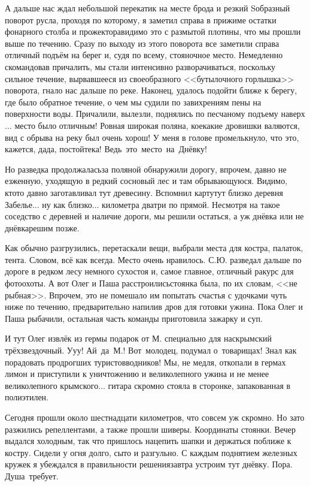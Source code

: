 А дальше нас ждал небольшой перекатик на месте брода и резкий S\sdash образный поворот русла, проходя по которому, я заметил справа в прижиме остатки фонарного столба и прожектора\mdash видимо это с размытой плотины, что мы прошли выше по течению. Сразу по выходу из этого поворота все заметили справа отличный подъём на берег и, судя по всему, стояночное место. Немедленно скомандовав причалить, мы стали интенсивно разворачиваться, поскольку сильное течение, вырвавшееся из своеобразного <<бутылочного горлышка>> поворота, гнало нас дальше по реке. Наконец, удалось подойти ближе к берегу, где было обратное течение, о чем мы судили по завихрениям пены на поверхности воды. Причалили, вылезли, поднялись по песчаному подъему наверх$\ldots$ место было отличным! Ровная широкая поляна, кое\sdash какие дровишки валяются, вид с обрыва на реку был очень хорош! У меня в голове промелькнуло, что это, кажется, да\sdash да, постойте\sdash ка! Ведь~это~место~на~Днёвку! 

Но разведка продолжалась\mdash за поляной обнаружили дорогу, впрочем, давно не езженную, уходящую в редкий сосновый лес и там обрывающуюся. Видимо, кто\sdash то давно заготавливал тут древесину. Вспомнил карту\mdash тут близко деревня Забелье$\ldots$ ну как близко$\ldots$ километра два\sdash три по прямой. Несмотря на такое соседство с деревней и наличие дороги, мы решили остаться, а уж днёвка или не днёвка\mdash решим позже.

Как обычно разгрузились, перетаскали вещи, выбрали места для костра, палаток, тента. Словом, всё как всегда. Место очень нравилось. С.Ю. разведал дальше по дороге в редком лесу немного сухостоя и, самое главное, отличный ракурс для фотоохоты. А вот Олег и Паша расстроились\mdash стоянка была, по их словам, <<не рыбная>>. Впрочем, это не помешало им попытать счастья с удочками чуть ниже по течению, предварительно напилив дров для готовки ужина. Пока Олег и Паша рыбачили, остальная часть команды приготовила зажарку и суп.

И тут Олег извлёк из гермы подарок от М. специально для нас\mdash крымский трёхзвездочный. У\sdash у\sdash у! Ай~да~М.! Вот~молодец, подумал о~товарищах! Знал как порадовать продрогших туристов\sdash водников! Мы, не медля, откопали в гермах лимон и приступили к уничтожению и великолепного ужина и не менее великолепного крымского$\ldots$ гитара скромно стояла в сторонке, запакованная в полиэтилен. 

Сегодня прошли около шестнадцати километров, что совсем уж скромно. Но зато разжились репеллентами, а также прошли шиверы. Координаты стоянки\mdash \CoordsLidSeventeenDnevka. Вечер выдался холодным, так что пришлось нацепить шапки и держаться поближе к костру. Сидели у огня долго, сыто и разгульно. С каждым поднятием железных кружек я убеждался в правильности решения\mdash завтра устроим тут днёвку. Пора. Душа~требует. 

\begin{center}
\end{center}
